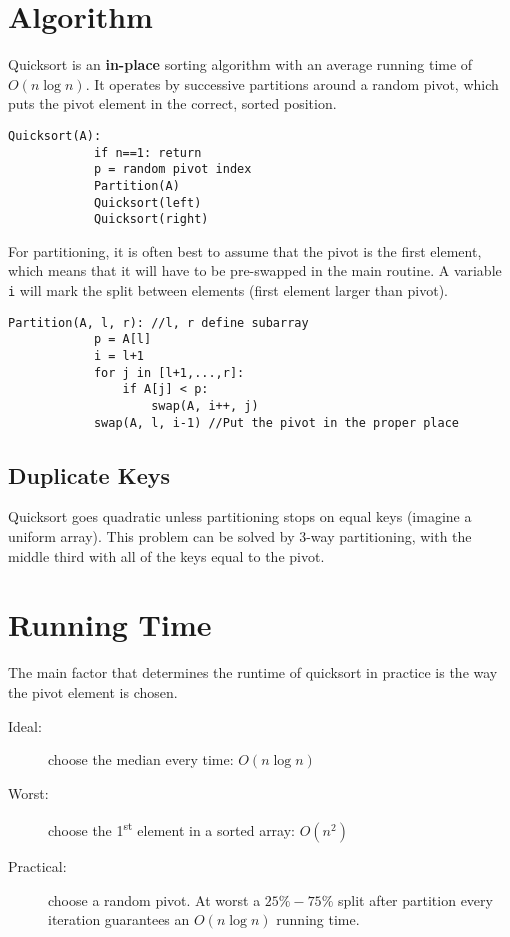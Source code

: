 \documentclass[11pt]{article}
\begin{document}
\section{Algorithm}
	Quicksort is an \textbf{in-place} sorting algorithm with an average running time of $O(n\log n)$. It operates by successive partitions around a random pivot, which puts the pivot element in the correct, sorted position.
	
	\begin{lstlisting}[autogobble=true]
		Quicksort(A):
			if n==1: return
			p = random pivot index
			Partition(A)
			Quicksort(left)
			Quicksort(right)
	\end{lstlisting}
	
	For partitioning, it is often best to assume that the pivot is the first element, which means that it will have to be pre-swapped in the main routine. A variable \verb|i| will mark the split between elements (first element larger than pivot).
	
	\begin{lstlisting}[autogobble=true]
		Partition(A, l, r):	//l, r define subarray
			p = A[l]
			i = l+1
			for j in [l+1,...,r]:
				if A[j] < p:
					swap(A, i++, j)
			swap(A, l, i-1)	//Put the pivot in the proper place
	\end{lstlisting}
	
	\subsection{Duplicate Keys}
		Quicksort goes quadratic unless partitioning stops on equal keys (imagine a uniform array). This problem can be solved by 3-way partitioning, with the middle third with all of the keys equal to the pivot.
	
\section{Running Time}
	The main factor that determines the runtime of quicksort in practice is the way the pivot element is chosen.
	
	\begin{description}
		\item[Ideal:] choose the median every time: $O(n\log n)$
		\item[Worst:] choose the 1\textsuperscript{st} element in a sorted array: $O(n^2)$
		\item[Practical:] choose a random pivot. At worst a $25\%-75\%$ split after partition every iteration guarantees an $O(n\log n)$ running time.
	\end{description}
	
\end{document}
